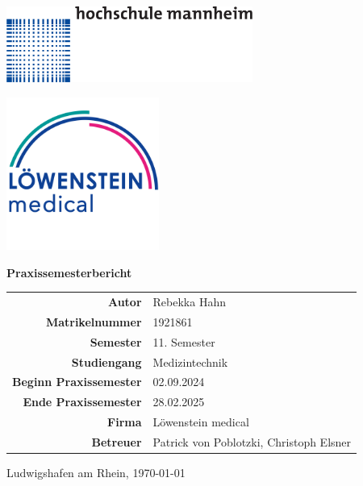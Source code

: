 \documentclass[a4paper, 12pt]{article}
\begin{document}
\begin{titlepage}
	\centering

    \begin{minipage}{0.1\textwidth}
        \includegraphics[height=2.5cm]
        {Hochschule_Mannheim_logo.png}
    \end{minipage}
    \hfill 
    \begin{minipage}{0.33\textwidth}
        \includegraphics[height=5cm]
        {loewenstein_logo.png}
    \end{minipage}	

    \vspace{2.5cm} %
	
	{\Huge\bfseries Praxissemesterbericht \par}
    \vspace{2cm} %

    \begin{tabular}{ r  l }
        \textbf{Autor} & Rebekka Hahn \\
        \textbf{Matrikelnummer} & 1921861 \\
        \textbf{Semester} & 11. Semester \\
        \textbf{Studiengang} & Medizintechnik \\
        \textbf{Beginn Praxissemester} & 02.09.2024 \\
        \textbf{Ende Praxissemester} & 28.02.2025 \\
        \textbf{Firma} & Löwenstein medical \\
        \textbf{Betreuer} & Patrick von Poblotzki, Christoph Elsner \\
    \end{tabular}
    
    \vfill %

    {\large Ludwigshafen am Rhein, \today \par}

\end{titlepage}
\end{document}

